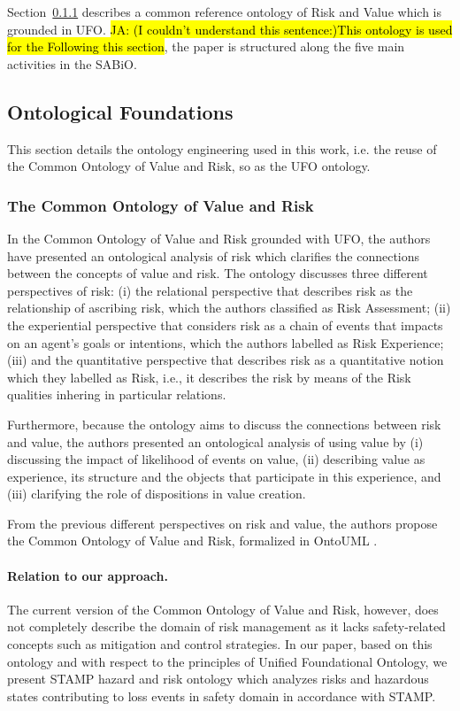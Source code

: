 \documentclass[sw]{iosart2x}
\newcommand{\COMMENT}[1]{\hl{ \textnormal{#1}}}
\newcommand{\COMMENT}[2]{\hl{ \textnormal{#1} \textbf{comment:} \textit{#2}}\xspace}
\newcommand{\sabio}[0]{SABiO}
\begin{document}
Section~\ref{sec:back:onto:risk} describes a common reference ontology of Risk and Value which is grounded in UFO. \COMMENT{ JA: (I couldn't understand this sentence:)This ontology is used for the 
Following this section}, the paper is structured along the five main activities in the \sabio{}.

\subsection{Ontological Foundations}
\label{sec:back:onto}
This section details the ontology engineering used in this work, i.e. the reuse of the Common Ontology of Value and Risk, so as the UFO ontology.

\subsubsection{The Common Ontology of Value and Risk}
\label{sec:back:onto:risk}
In the Common Ontology of Value and Risk \cite{unknown} grounded with UFO, the authors have presented an ontological analysis of risk which clarifies the connections between the concepts of value and risk. The ontology discusses three different perspectives of risk: (i) the relational perspective that describes risk as the relationship of ascribing risk, which the authors classified as Risk Assessment; (ii) the experiential perspective that considers risk as a chain of events that impacts on an agent’s goals or intentions, which the authors labelled as Risk Experience; (iii) and the quantitative perspective that describes risk as a quantitative notion which they labelled as Risk, i.e., it describes the risk by means of the Risk qualities inhering in particular relations. 

Furthermore, because the ontology aims to discuss the connections between risk and value, the authors presented an ontological analysis of using value by (i) discussing the impact of likelihood of events on value, (ii) describing value as experience, its structure and the objects that participate in this experience, and (iii) clarifying the role of dispositions in value creation.

From the previous different perspectives on risk and value, the authors propose the Common Ontology of Value and Risk, formalized in OntoUML \cite{Guizzardi2005c}.

\paragraph{Relation to our approach.}
The current version of the Common Ontology of Value and Risk, however, does not completely describe the domain of risk management as it lacks safety-related concepts such as mitigation and control strategies. In our paper, based on this ontology and with respect to the principles of Unified Foundational Ontology, we present STAMP hazard and risk ontology which analyzes risks and hazardous states contributing to loss events in safety domain in accordance with STAMP. 
\end{document}
